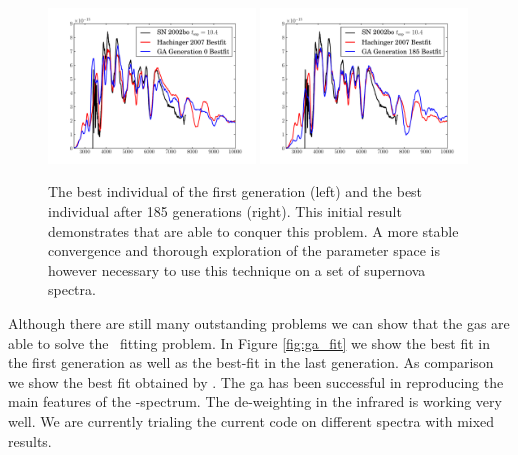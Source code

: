 \begin{figure}[htbp] %
   \centering
   \includegraphics[width=0.49\textwidth]{chapter_dalek/plots/plot_ga0_speccompare.pdf} 
   \includegraphics[width=0.49\textwidth]{chapter_dalek/plots/plot_ga185_speccompare.pdf} 
   \caption{The best individual of the first generation (left) and the best individual after 185 generations (right). This initial result demonstrates that  are able to conquer this problem. A more stable convergence and thorough exploration of the parameter space is however necessary to use this technique on a set of supernova spectra.}
   \label{fig:example}
\end{figure}

Although there are still many outstanding problems we can show that the \glspl{ga} are able to solve the \sneia\ fitting problem. In Figure \ref{fig:ga_fit} we show the best fit in the first generation as well as the best-fit in the last generation. As comparison we show the best fit obtained by \citet{hachinger_dipl2007}. The \gls{ga} has been successful in reproducing the main features of the \sneia-spectrum. The de-weighting in the infrared is working very well. We are currently trialing the current code on different spectra with mixed results. 


